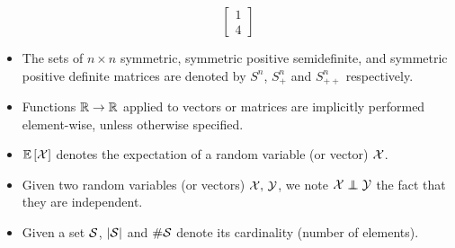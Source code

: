 \begin{itemize}
\begin{equation*}
        \begin{bmatrix}
            1\\
            4
        \end{bmatrix}
    \end{equation*}
    \item The sets of $n \times n$ symmetric,
        symmetric positive semidefinite,
        and symmetric positive definite matrices
        are denoted by $S^n$, $S^n_+$ and $S^n_{++}$ respectively.
    \item Functions $\mathbb{R} \to \mathbb{R}$ applied to vectors or matrices are implicitly performed element-wise,
        unless otherwise specified.
    \item ${\mathbb E}\left[\mathcal{X}\right]$ denotes the expectation of a random variable (or vector) $\mathcal{X}$.
    \item Given two random variables (or vectors) $\mathcal{X},\, \mathcal{Y}$,
        we note $\cX \independent \cY$ the fact that they are independent.
    \item Given a set $\mathcal{S}$, $\left\lvert\mathcal{S}\right\rvert$ and $\#\mathcal{S}$ denote its cardinality (number of elements).
\end{itemize}
